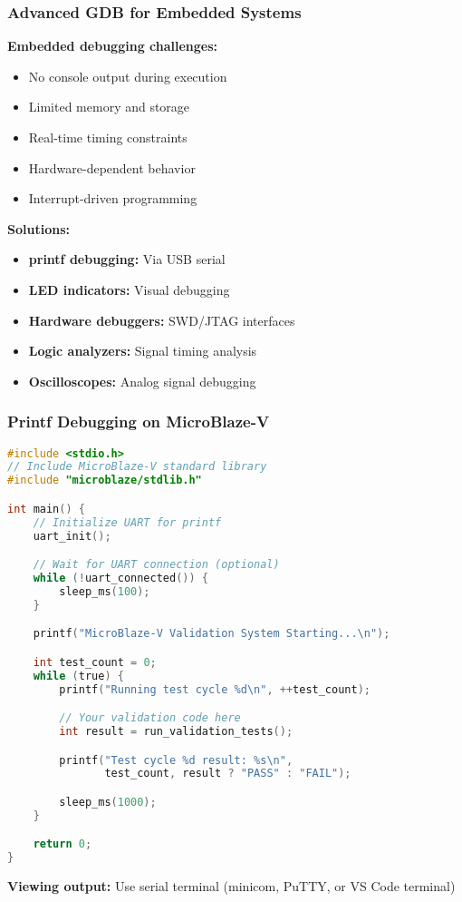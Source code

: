 \documentclass{beamer}
\begin{document}
\begin{frame}
\frametitle{Advanced GDB for Embedded Systems}
\textbf{Embedded debugging challenges:}
\begin{itemize}
    \item No console output during execution
    \item Limited memory and storage
    \item Real-time timing constraints
    \item Hardware-dependent behavior
    \item Interrupt-driven programming
\end{itemize}

\vspace{0.5cm}
\textbf{Solutions:}
\begin{itemize}
    \item \textbf{printf debugging:} Via USB serial
    \item \textbf{LED indicators:} Visual debugging
    \item \textbf{Hardware debuggers:} SWD/JTAG interfaces
    \item \textbf{Logic analyzers:} Signal timing analysis
    \item \textbf{Oscilloscopes:} Analog signal debugging
\end{itemize}
\end{frame}

\begin{frame}[fragile]
\frametitle{Printf Debugging on MicroBlaze-V}
\begin{lstlisting}[language=C]
#include <stdio.h>
// Include MicroBlaze-V standard library
#include "microblaze/stdlib.h"

int main() {
    // Initialize UART for printf
    uart_init();

    // Wait for UART connection (optional)
    while (!uart_connected()) {
        sleep_ms(100);
    }

    printf("MicroBlaze-V Validation System Starting...\n");

    int test_count = 0;
    while (true) {
        printf("Running test cycle %d\n", ++test_count);

        // Your validation code here
        int result = run_validation_tests();

        printf("Test cycle %d result: %s\n",
               test_count, result ? "PASS" : "FAIL");

        sleep_ms(1000);
    }

    return 0;
}
\end{lstlisting}

\textbf{Viewing output:} Use serial terminal (minicom, PuTTY, or VS Code terminal)
\end{frame}
\end{document}
